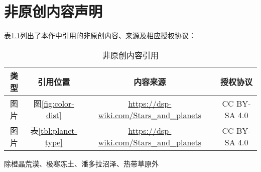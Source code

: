 
\chapter{非原创内容声明}

表\ref{tbl:statement}列出了本作中引用的非原创内容、来源及相应授权协议：

\begin{table}[ht]
    \centering
    \small
    \caption{非原创内容引用}
    \begin{threeparttable}
        \begin{tabular}{cccc}
            \toprule
            类型 & 引用位置 & 内容来源 & 授权协议 \\
            \midrule
            图片 & 图\ref{fig:color-dist} & \url{https://dsp-wiki.com/Stars_and_planets} & CC BY-SA 4.0 \\
            图片 & 表\ref{tbl:planet-type}\tnote{1} & \url{https://dsp-wiki.com/Stars_and_planets} & CC BY-SA 4.0 \\
            \bottomrule
        \end{tabular}
        \begin{tablenotes}
            \item[1] 除橙晶荒漠、极寒冻土、潘多拉沼泽、热带草原外
        \end{tablenotes}
    \end{threeparttable}
    \label{tbl:statement}
\end{table}
